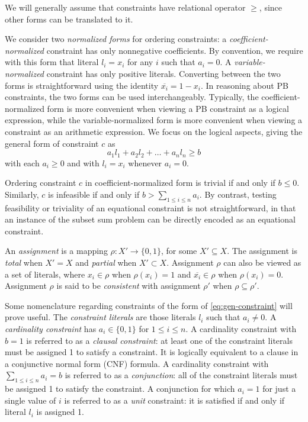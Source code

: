 \message{ !name(FMCAD2024.tex)}\documentclass{fmcad}
\begin{document}
We will generally assume that constraints have relational operator $\geq$, since other forms can
be translated to it.

We consider two \textit{normalized forms} for ordering constraints: a \textit{coefficient-normalized}
constraint has only nonnegative coefficients. By convention, we require with this form that literal
$l_i = x_i$ for any $i$ such that $a_i = 0$. A \textit{variable-normalized} constraint has only
positive literals. Converting between the two forms is straightforward using the identity
$\overline{x_i} = 1 - x_i$. In reasoning about PB constraints, the two forms can be used
interchangeably. Typically, the coefficient-normalized form is more convenient when viewing a PB
constraint as a logical expression, while the variable-normalized form is more convenient when
viewing a constraint as an arithmetic expression. We focus on the logical aspects, giving
the general form of constraint $c$ as
\begin{equation}
  \label{eq:gen-constraint}
  a_1 l_1 + a_2 l_2 + \dots + a_n l_n \geq b
\end{equation}
with each $a_i \geq 0$ and with $l_i = x_i$ whenever $a_i = 0$.

Ordering constraint $c$ in coefficient-normalized form is trivial if and only if $b \leq 0$.
Similarly, $c$ is infeasible if and only if $b > \sum_{1 \leq i \leq n} a_i$. By contrast, testing
feasibility or triviality of an equational constraint is not straightforward, in that an instance
of the subset sum problem \cite{garey1972optimal} can be directly encoded as an equational constraint.

An \textit{assignment} is a mapping $\rho : X' \rightarrow \{0, 1\}$, for some $X' \subseteq X$.
The assignment is \textit{total} when $X' = X$ and \textit{partial} when $X' \subset X$. Assignment
$\rho$ can also be viewed as a set of literals, where $x_i \in \rho$ when $\rho(x_i) = 1$ and
$\overline{x_i} \in \rho$ when $\rho(x_i) = 0$. Assignment $\rho$ is said to be \textit{consistent}
with assignment $\rho'$ when $\rho \subseteq \rho'$.

Some nomenclature regarding constraints of the form of \ref{eq:gen-constraint} will prove useful.
The \textit{constraint literals} are those literals $l_i$ such that $a_i \neq 0$.
A \textit{cardinality constraint} has $a_i \in \{0, 1\}$ for $1 \leq i \leq n$. A cardinality
constraint with $b = 1$ is referred to as a \textit{clausal constraint}: at least one of the
constraint literals must be assigned 1 to satisfy a constraint. It is logically equivalent
to a clause in a conjunctive normal form (CNF) formula. A cardinality constraint with
$\sum_{1 \leq i \leq n} a_i = b$ is referred to as a \textit{conjunction}: all of the constraint
literals must be assigned 1 to satisfy the constraint. A conjunction for which $a_i = 1$ for just
a single value of $i$ is referred to as a \textit{unit} constraint: it is satisfied if and only
if literal $l_i$ is assigned 1.
\end{document}
